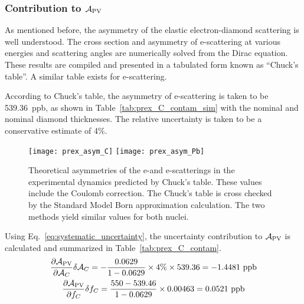 \subsubsection{Contribution to $\mathcal{A}_{\text{PV}}$}
As mentioned before, the asymmetry of the elastic electron-diamond scattering is well understood.
The cross section and asymmetry of e-\Carbon scattering at various energies 
and scattering angles are numerically solved from the Dirac equation. 
These results are compiled and presented in a tabulated form known as ``Chuck's table''. 
A similar table exists for e-\Pb scattering.

According to Chuck's table, the asymmetry of e-\Carbon scattering is taken 
to be 539.36~ppb, as shown in Table~\ref{tab:prex_C_contam_sim}
with the nominal \Pb and nominal diamond thicknesses. The relative uncertainty is taken
to be a conservative estimate of 4\%.
\begin{figure}[!h]
    \centering
    \texttt{[image: prex\_asym\_C]}
    \texttt{[image: prex\_asym\_Pb]}
    \caption[Theoretical asymmetries of the e-\Carbon and e-\Pb scattering]
    {Theoretical asymmetries of the e-\Carbon and e-\Pb scatterings in the experimental 
    dynamics predicted by Chuck's table. These values include the Coulomb correction. 
    The Chuck's table is cross checked by the Standard Model Born approximation 
    calculation. The two methods yield similar values for both nuclei.}
    \label{fig:prex_asym}
\end{figure}

Using Eq.~\ref{eq:systematic_uncertainty}, the uncertainty contribution to $\mathcal{A}_{\text{PV}}$
is calculated and summarized in Table~\ref{tab:prex_C_contam}.
\begin{equation}
    \begin{gathered}
	\frac{\partial \mathcal{A}_{\text{PV}}}{\partial \mathcal{A}_C} \delta \mathcal{A}_C = 
	-\frac{0.0629}{1 - 0.0629} \times 4\% \times 539.36 = -1.4481\ \mathrm{ppb}   \\
	\frac{\partial \mathcal{A}_{\text{PV}}}{\partial f_C}\delta f_C =
	\frac{550 - 539.46}{1 - 0.0629} \times 0.00463 = 0.0521\ \mathrm{ppb}	\\
    \end{gathered}
\end{equation}

